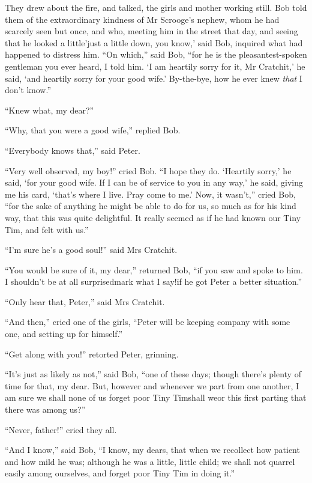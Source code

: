 \documentclass[paper=5.5in:8.5in,BCOR=5mm,twoside,DIV=calc,12pt,usegeometry]{scrbook} %
\begin{document}
They drew about the fire, and talked, the girls and mother working still. Bob told them of the extraordinary kindness of Mr Scrooge's nephew, whom he had scarcely seen but once, and who, meeting him in the street that day, and seeing that he looked a little\textemdash 'just a little down, you know,' said Bob, inquired what had happened to distress him. \enquote{On which,} said Bob, \enquote{for he is the pleasantest-spoken gentleman you ever heard, I told him. \enquote{I am heartily sorry for it, Mr Cratchit,} he said, \enquote{and heartily sorry for your good wife.} By-the-bye, how he ever knew \textit{that} I don't know.}

\enquote{Knew what, my dear?}

\enquote{Why, that you were a good wife,} replied Bob.

\enquote{Everybody knows that,} said Peter.

\enquote{Very well observed, my boy!} cried Bob. \enquote{I hope they do. \enquote{Heartily sorry,} he said, \enquote{for your good wife. If I can be of service to you in any way,} he said, giving me his card, \enquote{that's where I live. Pray come to me.} Now, it wasn't,} cried Bob, \enquote{for the sake of anything he might be able to do for us, so much as for his kind way, that this was quite delightful. It really seemed as if he had known our Tiny Tim, and felt with us.}

\enquote{I'm sure he's a good soul!} said Mrs Cratchit.

\enquote{You would be sure of it, my dear,} returned Bob, \enquote{if you saw and spoke to him. I shouldn't be at all surprised\textemdash mark what I say!\textemdash if he got Peter a better situation.}

\enquote{Only hear that, Peter,} said Mrs Cratchit.

\enquote{And then,} cried one of the girls, \enquote{Peter will be keeping company with some one, and setting up for himself.}

\enquote{Get along with you!} retorted Peter, grinning.

\enquote{It's just as likely as not,} said Bob, \enquote{one of these days; though there's plenty of time for that, my dear. But, however and whenever we part from one another, I am sure we shall none of us forget poor Tiny Tim\textemdash shall we\textemdash or this first parting that there was among us?}

\enquote{Never, father!} cried they all.

\enquote{And I know,} said Bob, \enquote{I know, my dears, that when we recollect how patient and how mild he was; although he was a little, little child; we shall not quarrel easily among ourselves, and forget poor Tiny Tim in doing it.}
\end{document}
